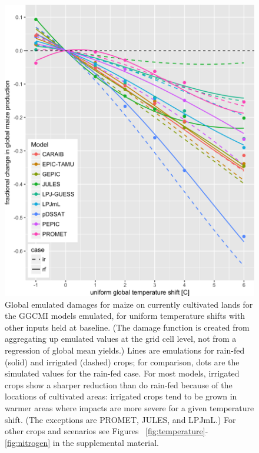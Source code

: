 \documentclass[preprint, 5p, times, twocolumn]{elsarticle}
\begin{document}
\begin{figure}[!htb]
    \centering
    \includegraphics[width=0.95\linewidth]{global_em_maize.png}
    \caption{Global emulated damages for maize on currently cultivated lands for the GGCMI models emulated, for uniform temperature shifts with other inputs held at baseline. (The damage function is created from aggregating up emulated values at the grid cell level, not from a regression of global mean yields.) Lines are emulations for rain-fed (solid) and irrigated (dashed) crops; for comparison, dots are the simulated values for the rain-fed case.  For most models, irrigated crops show a sharper reduction than do rain-fed because of the locations of cultivated areas: irrigated crops tend to be grown in warmer areas where impacts are more severe for a given temperature shift. (The exceptions are PROMET, JULES, and LPJmL.) For other crops and scenarios see Figures ~\ref{fig:temperature}- \ref{fig:nitrogen} in the supplemental material.}
    \label{fig:globe_em}
\end{figure}
\end{document}

